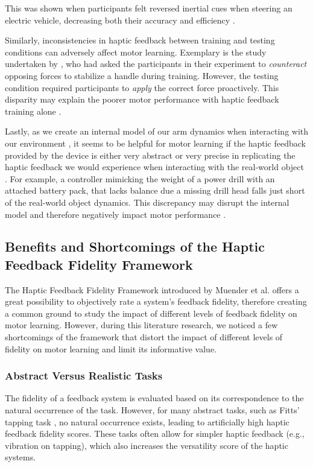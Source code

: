 This was shown when participants felt reversed inertial cues when steering an electric vehicle, decreasing both their accuracy and efficiency \cite{Macuga2019}. 

Similarly, inconsistencies in haptic feedback between training and testing conditions can adversely affect motor learning. Exemplary is the study undertaken by \cite{Morris2007}, who had asked the participants in their experiment to \textit{counteract} opposing forces to stabilize a handle during training. However, the testing condition required participants to \textit{apply} the correct force proactively. This disparity may explain the poorer motor performance with haptic feedback training alone \cite{Morris2007}.

Lastly, as we create an internal model of our arm dynamics when interacting with our environment \cite{Pierella2019TheModels}, it seems to be helpful for motor learning if the haptic feedback provided by the device is either very abstract or very precise in replicating the haptic feedback we would experience when interacting with the real-world object \cite{Yang2023}. For example, a controller mimicking the weight of a power drill with an attached battery pack, that lacks balance due a missing drill head falls just short of the real-world object dynamics. This discrepancy may disrupt the internal model and therefore negatively impact motor performance \cite{Yang2023}. 


\subsection{Benefits and Shortcomings of the Haptic Feedback Fidelity Framework}
The Haptic Feedback Fidelity Framework introduced by Muender et al. offers a great possibility to objectively rate a system's feedback fidelity, therefore creating a common ground to study the impact of different levels of feedback fidelity on motor learning. However, during this literature research, we noticed a few shortcomings of the framework that distort the impact of different levels of fidelity on motor learning and limit its informative value.

\subsubsection{Abstract Versus Realistic Tasks}
The fidelity of a feedback system is evaluated based on its correspondence to the natural occurrence of the task. However, for many abstract tasks, such as Fitts' tapping task \cite{Fitts1954TheMovement}, no natural occurrence exists, leading to artificially high haptic feedback fidelity scores. These tasks often allow for simpler haptic feedback (e.g., vibration on tapping), which also increases the versatility score of the haptic systems. 

